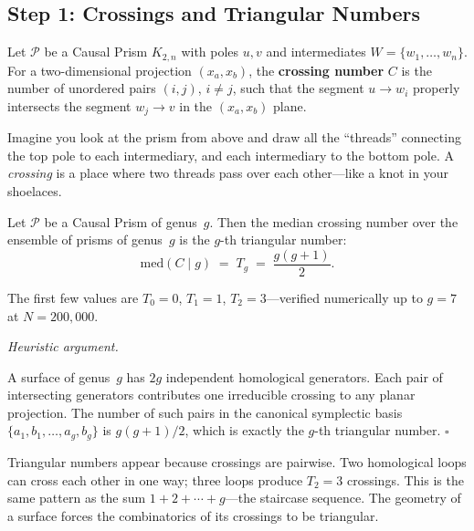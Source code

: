 \documentclass[11pt, a4paper, openany]{book}
\newcounter{thm}[chapter]
\renewenvironment{proof}[1][Proof]{%
  \par\noindent\textit{#1.}\quad
}{\hfill$\square$\par\medskip}
\begin{document}
\subsection{Step 1: Crossings and Triangular Numbers}

\begin{definition}
\label{def:crossing-number}
Let $\mathcal{P}$ be a Causal Prism $K_{2,n}$ with poles $u,v$ and
intermediates $W = \{w_1, \ldots, w_n\}$. For a two-dimensional
projection $(x_a, x_b)$, the \textbf{crossing number} $C$ is the
number of unordered pairs $(i,j)$, $i \ne j$, such that the
segment $u \to w_i$ properly intersects the segment $w_j \to v$
in the $(x_a, x_b)$ plane.
\end{definition}

\noindent
Imagine you look at the prism from above and draw all the ``threads''
connecting the top pole to each intermediary, and each intermediary
to the bottom pole. A \emph{crossing} is a place where two threads
pass over each other---like a knot in your shoelaces.

\begin{theorem}
\label{thm:triangular-mass}
Let $\mathcal{P}$ be a Causal Prism of genus~$g$.  Then the
median crossing number over the ensemble of prisms of genus~$g$ is
the $g$-th triangular number:
\[
  \mathrm{med}(C \mid g) \;=\; T_g \;=\; \frac{g(g+1)}{2}.
\]
\end{theorem}

\noindent The first few values are $T_0 = 0$, $T_1 = 1$,
$T_2 = 3$---verified numerically up to $g = 7$ at $N = 200{,}000$.

\begin{proof}[Heuristic argument]
A surface of genus~$g$ has $2g$ independent homological generators.
Each pair of intersecting generators contributes one irreducible
crossing to any planar projection. The number of such pairs in the
canonical symplectic basis $\{a_1, b_1, \ldots, a_g, b_g\}$ is
$g(g+1)/2$, which is exactly the $g$-th triangular number.
\end{proof}

\begin{logicalreading}
Triangular numbers appear because crossings are pairwise. Two
homological loops can cross each other in one way; three loops
produce $T_2 = 3$ crossings. This is the same pattern as the sum
$1 + 2 + \cdots + g$---the staircase sequence.  The geometry of
a surface forces the combinatorics of its crossings to be
triangular.
\end{logicalreading}
\end{document}
